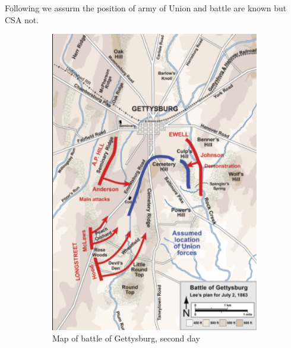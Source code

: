\documentclass{article}
\begin{document}
Following we assurm the position of army of Union and battle are known but CSA not.

\begin{figure}[h]
  \begin{subfigure}[b]{0.49\linewidth}
    \includegraphics[width=\linewidth]{gettysburg-map.png}
    \caption{Map of battle of Gettysburg, second day}
  \end{subfigure}
  \begin{subfigure}[b]{0.49\linewidth}

\end{subfigure}
\end{figure}
\end{document}

